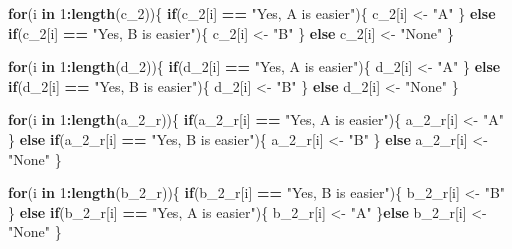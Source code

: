 \documentclass[
]{article}
\newenvironment{Shaded}{\begin{snugshade}}{\end{snugshade}}
\newcommand{\ControlFlowTok}[1]{\textcolor[rgb]{0.13,0.29,0.53}{\textbf{#1}}}
\newcommand{\DecValTok}[1]{\textcolor[rgb]{0.00,0.00,0.81}{#1}}
\newcommand{\KeywordTok}[1]{\textcolor[rgb]{0.13,0.29,0.53}{\textbf{#1}}}
\newcommand{\NormalTok}[1]{#1}
\newcommand{\OperatorTok}[1]{\textcolor[rgb]{0.81,0.36,0.00}{\textbf{#1}}}
\newcommand{\StringTok}[1]{\textcolor[rgb]{0.31,0.60,0.02}{#1}}
\begin{document}
\begin{Shaded}
\begin{Highlighting}[]
\ControlFlowTok{for}\NormalTok{(i }\ControlFlowTok{in} \DecValTok{1}\OperatorTok{:}\KeywordTok{length}\NormalTok{(c_}\DecValTok{2}\NormalTok{))\{}
  \ControlFlowTok{if}\NormalTok{(c_}\DecValTok{2}\NormalTok{[i] }\OperatorTok{==}\StringTok{ "Yes, A is easier"}\NormalTok{)\{}
\NormalTok{    c_}\DecValTok{2}\NormalTok{[i] <-}\StringTok{ "A"}
\NormalTok{  \} }\ControlFlowTok{else} \ControlFlowTok{if}\NormalTok{(c_}\DecValTok{2}\NormalTok{[i] }\OperatorTok{==}\StringTok{ "Yes, B is easier"}\NormalTok{)\{ }
\NormalTok{    c_}\DecValTok{2}\NormalTok{[i] <-}\StringTok{ "B"}
\NormalTok{  \} }\ControlFlowTok{else}\NormalTok{ c_}\DecValTok{2}\NormalTok{[i] <-}\StringTok{ "None"}
\NormalTok{\}}

\ControlFlowTok{for}\NormalTok{(i }\ControlFlowTok{in} \DecValTok{1}\OperatorTok{:}\KeywordTok{length}\NormalTok{(d_}\DecValTok{2}\NormalTok{))\{}
  \ControlFlowTok{if}\NormalTok{(d_}\DecValTok{2}\NormalTok{[i] }\OperatorTok{==}\StringTok{ "Yes, A is easier"}\NormalTok{)\{}
\NormalTok{    d_}\DecValTok{2}\NormalTok{[i] <-}\StringTok{ "A"}
\NormalTok{  \} }\ControlFlowTok{else} \ControlFlowTok{if}\NormalTok{(d_}\DecValTok{2}\NormalTok{[i] }\OperatorTok{==}\StringTok{ "Yes, B is easier"}\NormalTok{)\{ }
\NormalTok{    d_}\DecValTok{2}\NormalTok{[i] <-}\StringTok{ "B"}
\NormalTok{  \} }\ControlFlowTok{else}\NormalTok{ d_}\DecValTok{2}\NormalTok{[i] <-}\StringTok{ "None"}
\NormalTok{\}}





\ControlFlowTok{for}\NormalTok{(i }\ControlFlowTok{in} \DecValTok{1}\OperatorTok{:}\KeywordTok{length}\NormalTok{(a_}\DecValTok{2}\NormalTok{_r))\{}
  \ControlFlowTok{if}\NormalTok{(a_}\DecValTok{2}\NormalTok{_r[i] }\OperatorTok{==}\StringTok{ "Yes, A is easier"}\NormalTok{)\{}
\NormalTok{    a_}\DecValTok{2}\NormalTok{_r[i] <-}\StringTok{ "A"}
\NormalTok{  \} }\ControlFlowTok{else} \ControlFlowTok{if}\NormalTok{(a_}\DecValTok{2}\NormalTok{_r[i] }\OperatorTok{==}\StringTok{ "Yes, B is easier"}\NormalTok{)\{}
\NormalTok{  a_}\DecValTok{2}\NormalTok{_r[i] <-}\StringTok{ "B"}
\NormalTok{  \} }\ControlFlowTok{else}\NormalTok{ a_}\DecValTok{2}\NormalTok{_r[i] <-}\StringTok{ "None"}
\NormalTok{\}}

\ControlFlowTok{for}\NormalTok{(i }\ControlFlowTok{in} \DecValTok{1}\OperatorTok{:}\KeywordTok{length}\NormalTok{(b_}\DecValTok{2}\NormalTok{_r))\{}
  \ControlFlowTok{if}\NormalTok{(b_}\DecValTok{2}\NormalTok{_r[i] }\OperatorTok{==}\StringTok{ "Yes, B is easier"}\NormalTok{)\{}
\NormalTok{    b_}\DecValTok{2}\NormalTok{_r[i] <-}\StringTok{ "B"}
\NormalTok{  \} }\ControlFlowTok{else} \ControlFlowTok{if}\NormalTok{(b_}\DecValTok{2}\NormalTok{_r[i] }\OperatorTok{==}\StringTok{ "Yes, A is easier"}\NormalTok{)\{ }
\NormalTok{    b_}\DecValTok{2}\NormalTok{_r[i] <-}\StringTok{ "A"}
\NormalTok{    \}}\ControlFlowTok{else}\NormalTok{ b_}\DecValTok{2}\NormalTok{_r[i] <-}\StringTok{ "None"}
\NormalTok{\}}


\end{Highlighting}
\end{Shaded}
\end{document}
